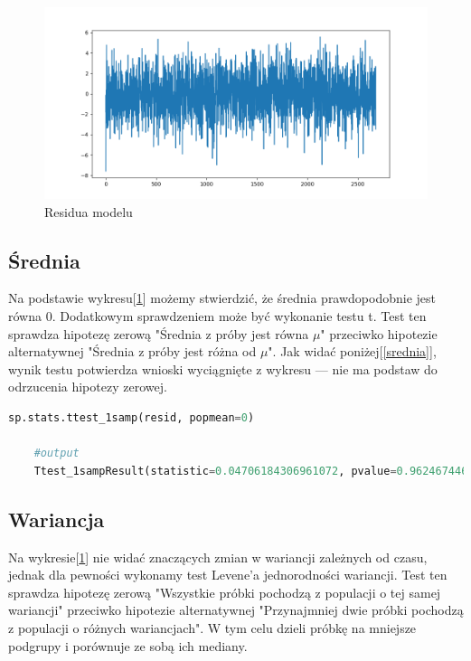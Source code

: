 \documentclass{article}
\theoremstyle{break}
\begin{document}
\begin{figure}[H]
	\begin{center}
		\includegraphics[scale=0.63]{res.png}
		\caption{Residua modelu}
		\label{fig:res}
	\end{center}
\end{figure}

\subsection{Średnia}
Na podstawie wykresu[\ref{fig:res}] możemy stwierdzić, że średnia prawdopodobnie jest równa 0. Dodatkowym sprawdzeniem może być wykonanie testu t. Test ten sprawdza hipotezę zerową "Średnia z próby jest równa $\mu$" przeciwko hipotezie alternatywnej "Średnia z próby jest różna od $\mu$". Jak widać poniżej[\ref{srednia}], wynik testu potwierdza wnioski wyciągnięte z wykresu — nie ma podstaw do odrzucenia hipotezy zerowej.

\begin{lstlisting}[language=Python, caption=Test t, label={srednia}]
	sp.stats.ttest_1samp(resid, popmean=0)
	
	#output
	Ttest_1sampResult(statistic=0.04706184306961072, pvalue=0.9624674462497231)
\end{lstlisting}

\subsection{Wariancja}
Na wykresie[\ref{fig:res}] nie widać znaczących zmian w wariancji zależnych od czasu, jednak dla pewności wykonamy test Levene'a jednorodności wariancji. Test ten sprawdza hipotezę zerową "Wszystkie próbki pochodzą z populacji o tej samej wariancji" przeciwko hipotezie alternatywnej "Przynajmniej dwie próbki pochodzą z populacji o różnych wariancjach". W tym celu dzieli próbkę na mniejsze podgrupy i porównuje ze sobą ich mediany.
\end{document}
